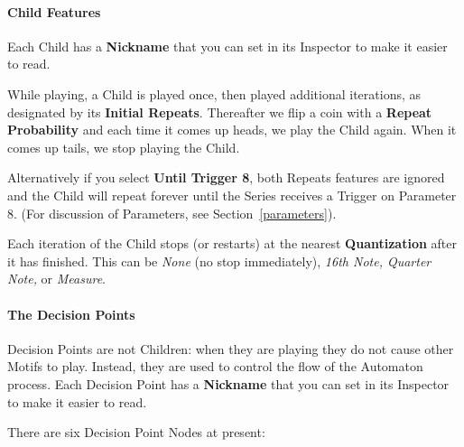 \documentclass[twoside,10pt]{article}
\begin{document}
\paragraph{Child Features}

Each Child has a {\bf Nickname} that you can set in its Inspector to make it easier to read.

While playing, a Child is played once, then played additional iterations, as designated by its {\bf Initial Repeats}.  Thereafter we flip a coin with a {\bf Repeat Probability} and each time it comes up heads, we play the Child again.  When it comes up tails, we stop playing the Child.

Alternatively if you select {\bf Until Trigger 8}, both Repeats features are ignored and the Child  will repeat forever until the Series receives a Trigger on Parameter 8.  (For discussion of Parameters, see Section~\ref{parameters}).

Each iteration of the Child stops (or restarts) at the nearest {\bf Quantization} after it has finished.  This can be {\it None} (no stop immediately), {\it 16th Note, Quarter Note,} or {\it Measure}.



\paragraph{The Decision Points}

Decision Points are not Children: when they are playing they do not cause other Motifs to play.  Instead, they are used to control the flow of the Automaton process.    Each Decision Point has a {\bf Nickname} that you can set in its Inspector to make it easier to read.  

There are six Decision Point Nodes at present:
\end{document}
